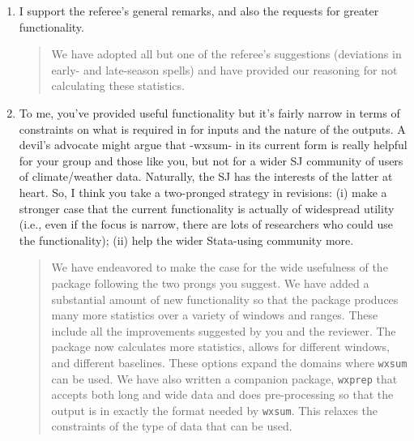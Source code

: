 \documentclass{article}[11pt]
\begin{document}
\begin{enumerate}
    \item I support the referee’s general remarks, and also the requests for greater functionality. 
    \begin{quote}
        We have adopted all but one of the referee's suggestions (deviations in early- and late-season spells) and have provided our reasoning for not calculating these statistics.
    \end{quote}

    \item To me, you’ve provided useful functionality but it’s fairly narrow in terms of constraints on what is required in for inputs and the nature of the outputs. A devil’s advocate might argue that -wxsum- in its current form is really helpful for your group and those like you, but not for a wider SJ community of users of climate/weather data. Naturally, the SJ has the interests of the latter at heart. So, I think you take a two-pronged strategy in revisions: (i) make a stronger case that the current functionality is actually of widespread utility (i.e., even if the focus is narrow, there are lots of researchers who could use the functionality); (ii) help the wider Stata-using community more.
    \begin{quote}
        We have endeavored to make the case for the wide usefulness of the package following the two prongs you suggest. We have added a substantial amount of new functionality so that the package produces many more statistics over a variety of windows and ranges. These include all the improvements suggested by you and the reviewer. The package now calculates more statistics, allows for different windows, and different baselines. These options expand the domains where \texttt{wxsum} can be used. We have also written a companion package, \texttt{wxprep} that accepts both long and wide data and does pre-processing so that the output is in exactly the format needed by \texttt{wxsum}. This relaxes the constraints of the type of data that can be used. \\


\end{quote}
\end{enumerate}
\end{document}
